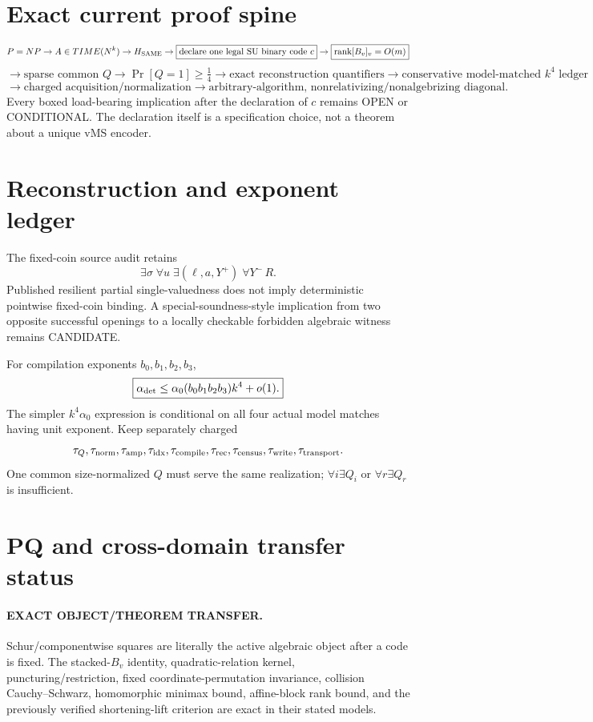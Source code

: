 \documentclass[11pt]{article}
\begin{document}
\section*{Exact current proof spine}
\[
P=NP
\to A\in TIME(N^k)
\to H_{\rm SAME}
\to\boxed{\text{declare one legal SU binary code }c}
\to\boxed{\operatorname{rank}[B_v]_v=O(m)}
\]
\[
\to\text{sparse common }Q
\to\Pr[Q=1]\ge\tfrac14
\to\boxed{\text{exact reconstruction quantifiers}}
\to\boxed{\text{conservative model-matched }k^4\text{ ledger}}
\]
\[
\to\boxed{\text{charged acquisition/normalization}}
\to\boxed{\text{arbitrary-algorithm, nonrelativizing/nonalgebrizing diagonal}}.
\]
Every boxed load-bearing implication after the declaration of \(c\) remains OPEN or CONDITIONAL. The declaration itself is a specification choice, not a theorem about a unique vMS encoder.

\section*{Reconstruction and exponent ledger}
The fixed-coin source audit retains
\[
\boxed{
\exists\sigma\;\forall u\;\exists(\ell,a,Y^+)\;\forall Y^-\,R.
}
\]
Published resilient partial single-valuedness does not imply deterministic pointwise fixed-coin binding. A special-soundness-style implication from two opposite successful openings to a locally checkable forbidden algebraic witness remains CANDIDATE.

For compilation exponents \(b_0,b_1,b_2,b_3\),
\[
\boxed{
\alpha_{\rm det}
\le
\alpha_0(b_0b_1b_2b_3)k^4+o(1).
}
\]
The simpler \(k^4\alpha_0\) expression is conditional on all four actual model matches having unit exponent. Keep separately charged
\[
\tau_Q,\tau_{\rm norm},\tau_{\rm amp},\tau_{\rm idx},
\tau_{\rm compile},\tau_{\rm rec},\tau_{\rm census},
\tau_{\rm write},\tau_{\rm transport}.
\]
One common size-normalized \(Q\) must serve the same realization; \(\forall i\exists Q_i\) or \(\forall r\exists Q_r\) is insufficient.

\section*{PQ and cross-domain transfer status}
\paragraph{EXACT OBJECT/THEOREM TRANSFER.}
Schur/componentwise squares are literally the active algebraic object after a code is fixed. The stacked-\(B_v\) identity, quadratic-relation kernel, puncturing/restriction, fixed coordinate-permutation invariance, collision Cauchy--Schwarz, homomorphic minimax bound, affine-block rank bound, and the previously verified shortening-lift criterion are exact in their stated models.
\end{document}
